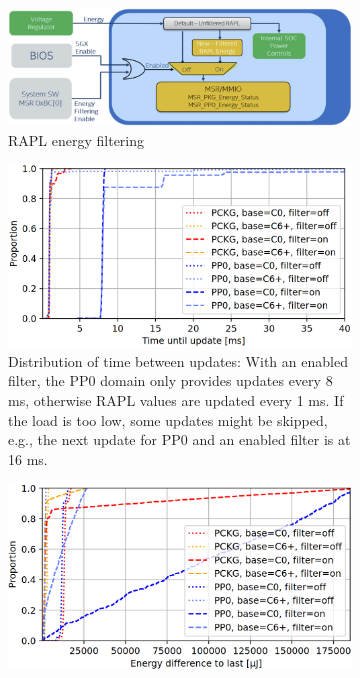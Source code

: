 \begin{itemize}
    \begin{figure}[H]
        \centering
        \begin{subfigure}[t]{0.6\textwidth}
            \includegraphics[width=\textwidth]{Figures/rapl_platypus_filtering.png}
            \caption{RAPL energy filtering\parencite{intel_rapl_guidance}}
            \label{fig:rapl_platypus_filtering}
        \end{subfigure}
        \begin{subfigure}[t]{0.48\textwidth}
            \includegraphics[width=\textwidth]{Figures/rapl_filter_granularity_loss_time.png}
            \caption{Distribution of time between updates: With an enabled filter, the PP0 domain only provides updates every 8 ms, otherwise RAPL values are updated every 1 ms. If the load is too low, some updates might be skipped, e.g., the next update for PP0 and an enabled filter is at 16 ms.}
            \label{fig:rapl_filter_granularity_loss_time}
        \end{subfigure}
        \hfill
        \begin{subfigure}[t]{0.48\textwidth}
            \includegraphics[width=\textwidth]{Figures/rapl_filter_granularity_loss_energy.png}

\end{subfigure}
\end{figure}
\end{itemize}
